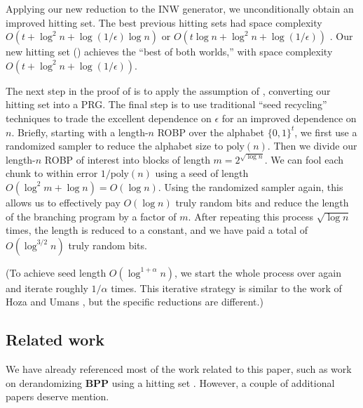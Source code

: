 Applying our new reduction to the INW generator, we unconditionally obtain an improved hitting set. The best previous hitting sets had space complexity $O(t + \log^2 n + \log(1/\epsilon) \log n)$ \cite{INW94} or $O(t \log n + \log^2 n + \log(1/\epsilon))$ \cite{HZ20}. Our new hitting set () achieves the ``best of both worlds,'' with space complexity $O(t + \log^2 n + \log(1/\epsilon))$.

The next step in the proof of  is to apply the assumption of , converting our hitting set into a PRG. The final step is to use traditional ``seed recycling'' techniques to trade the excellent dependence on $\epsilon$ for an improved dependence on $n$. Briefly, starting with a length-$n$ ROBP over the alphabet $\{0, 1\}^t$, we first use a randomized sampler \cite{GW97} to reduce the alphabet size to $\text{poly}(n)$. Then we divide our length-$n$ ROBP of interest into blocks of length $m = 2^{\sqrt{\log n}}$. We can fool each chunk to within error $1/\text{poly}(n)$ using a seed of length $O(\log^2 m + \log n) = O(\log n)$. Using the randomized sampler again, this allows us to effectively pay $O(\log n)$ truly random bits and reduce the length of the branching program by a factor of $m$. After repeating this process $\sqrt{\log n}$ times, the length is reduced to a constant, and we have paid a total of $O(\log^{3/2} n)$ truly random bits.

(To achieve seed length $O(\log^{1 + \alpha} n)$, we start the whole process over again and iterate roughly $1/\alpha$ times. This iterative strategy is similar to the work of Hoza and Umans \cite{HU22}, but the specific reductions are different.)

\subsection{Related work}

We have already referenced most of the work related to this paper, such as work on derandomizing $\mathbf{BPP}$ using a hitting set \cite{ACR98, BF99, ACRT99, GVW11}. However, a couple of additional papers deserve mention.

